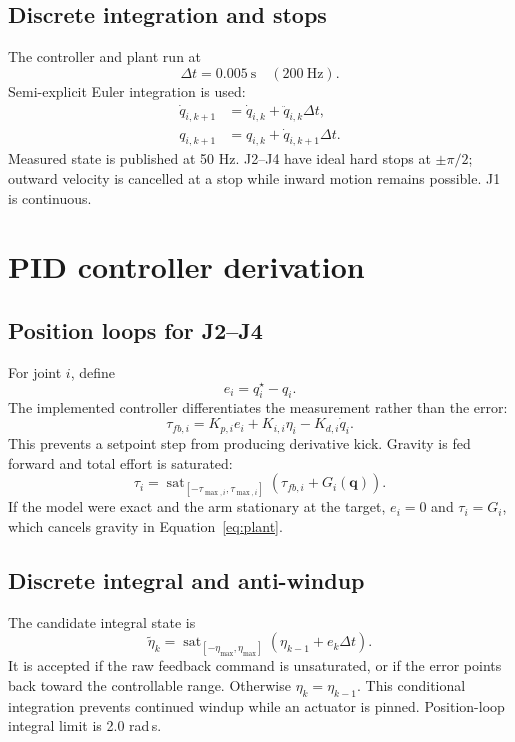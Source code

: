 \documentclass[11pt,a4paper]{article}
\newcommand{\vect}[1]{\bm{#1}}
\newcommand{\sat}[2]{\operatorname{sat}_{#1}\!\left(#2\right)}
\begin{document}
\subsection{Discrete integration and stops}
The controller and plant run at
\[
\Delta t=0.005\ \mathrm{s}\quad(200\ \mathrm{Hz}).
\]
Semi-explicit Euler integration is used:
\begin{align}
\dot q_{i,k+1}&=\dot q_{i,k}+\ddot q_{i,k}\Delta t,\\
q_{i,k+1}&=q_{i,k}+\dot q_{i,k+1}\Delta t.
\end{align}
Measured state is published at 50 Hz. J2--J4 have ideal hard stops at
$\pm\pi/2$; outward velocity is cancelled at a stop while inward motion remains
possible. J1 is continuous.

\section{PID controller derivation}

\subsection{Position loops for J2--J4}
For joint $i$, define
\[
e_i=q_i^{\star}-q_i.
\]
The implemented controller differentiates the measurement rather than the
error:
\begin{equation}
\tau_{fb,i}=K_{p,i}e_i+K_{i,i}\eta_i-K_{d,i}\dot q_i.
\label{eq:pid}
\end{equation}
This prevents a setpoint step from producing derivative kick. Gravity is fed
forward and total effort is saturated:
\begin{equation}
\boxed{
\tau_i=\sat{[-\tau_{\max,i},\tau_{\max,i}]}
{\tau_{fb,i}+G_i(\vect q)}.}
\label{eq:gravity-ff}
\end{equation}
If the model were exact and the arm stationary at the target, $e_i=0$ and
$\tau_i=G_i$, which cancels gravity in Equation~\eqref{eq:plant}.

\subsection{Discrete integral and anti-windup}
The candidate integral state is
\[
\tilde\eta_k=\sat{[-\eta_{\max},\eta_{\max}]}
{\eta_{k-1}+e_k\Delta t}.
\]
It is accepted if the raw feedback command is unsaturated, or if the error
points back toward the controllable range. Otherwise $\eta_k=\eta_{k-1}$. This
conditional integration prevents continued windup while an actuator is pinned.
Position-loop integral limit is 2.0 rad\,s.
\end{document}
